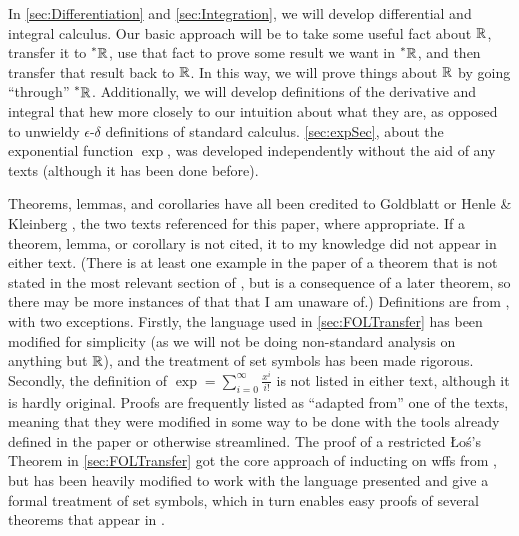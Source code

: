 In \autoref{sec:Differentiation} and \autoref{sec:Integration}, we will develop differential and integral calculus. Our basic approach will be to take some useful fact about $\mathbb{R}$, transfer it to $\prescript{*}{}{\mathbb{R}}$, use that fact to prove some result we want in $\prescript{*}{}{\mathbb{R}}$, and then transfer that result back to $\mathbb{R}$. In this way, we will prove things about $\mathbb{R}$ by going ``through'' $\prescript{*}{}{\mathbb{R}}$. Additionally, we will develop definitions of the derivative and integral that hew more closely to our intuition about what they are, as opposed to unwieldy $\epsilon$-$\delta$ definitions of standard calculus. \autoref{sec:expSec}, about the exponential function $\exp$, was developed independently without the aid of any texts (although it has been done before).

Theorems, lemmas, and corollaries have all been credited to Goldblatt \cite{goldblatt1998} or Henle \& Kleinberg \cite{henle1979}, the two texts referenced for this paper, where appropriate. If a theorem, lemma, or corollary is not cited, it to my knowledge did not appear in either text. (There is at least one example in the paper of a theorem that is not stated in the most relevant section of \cite{goldblatt1998}, but is a consequence of a later theorem, so there may be more instances of that that I am unaware of.) Definitions are from \cite{goldblatt1998}, with two exceptions. Firstly, the language used in \autoref{sec:FOLTransfer} has been modified for simplicity (as we will not be doing non-standard analysis on anything but $\mathbb{R}$), and the treatment of set symbols has been made rigorous. Secondly, the definition of $\exp = \sum_{i=0}^\infty \frac{x^i}{i!}$ is not listed in either text, although it is hardly original. Proofs are frequently listed as ``adapted from'' one of the texts, meaning that they were modified in some way to be done with the tools already defined in the paper or otherwise streamlined. The proof of a restricted \L o\'s's Theorem in \autoref{sec:FOLTransfer} got the core approach of inducting on wffs from \cite{henle1979}, but has been heavily modified to work with the language presented and give a formal treatment of set symbols, which in turn enables easy proofs of several theorems that appear in \cite{goldblatt1998}.
